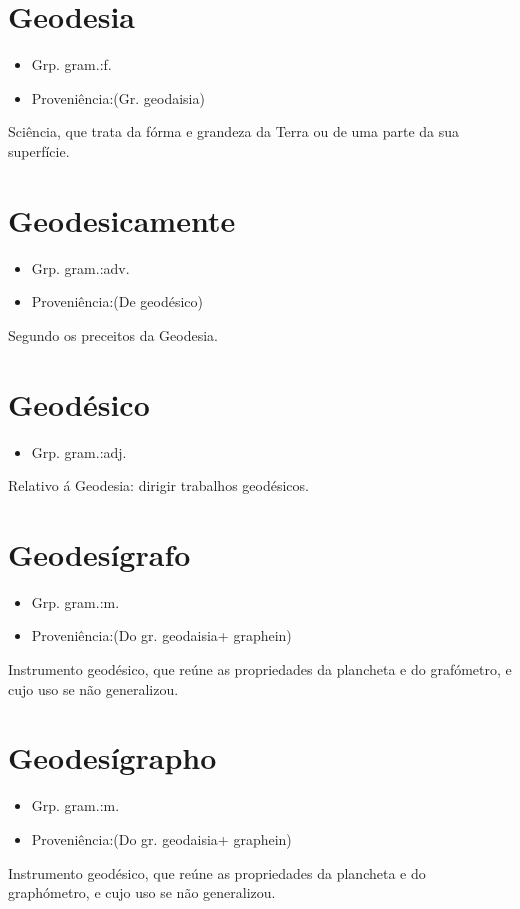 \section{Geodesia}
\begin{itemize}
\item {Grp. gram.:f.}
\end{itemize}
\begin{itemize}
\item {Proveniência:(Gr. \textunderscore geodaisia\textunderscore )}
\end{itemize}
Sciência, que trata da fórma e grandeza da Terra ou de uma parte da sua superfície.
\section{Geodesicamente}
\begin{itemize}
\item {Grp. gram.:adv.}
\end{itemize}
\begin{itemize}
\item {Proveniência:(De \textunderscore geodésico\textunderscore )}
\end{itemize}
Segundo os preceitos da Geodesia.
\section{Geodésico}
\begin{itemize}
\item {Grp. gram.:adj.}
\end{itemize}
Relativo á Geodesia: \textunderscore dirigir trabalhos geodésicos\textunderscore .
\section{Geodesígrafo}
\begin{itemize}
\item {Grp. gram.:m.}
\end{itemize}
\begin{itemize}
\item {Proveniência:(Do gr. \textunderscore geodaisia\textunderscore  + \textunderscore graphein\textunderscore )}
\end{itemize}
Instrumento geodésico, que reúne as propriedades da plancheta e do grafómetro, e cujo uso se não generalizou.
\section{Geodesígrapho}
\begin{itemize}
\item {Grp. gram.:m.}
\end{itemize}
\begin{itemize}
\item {Proveniência:(Do gr. \textunderscore geodaisia\textunderscore  + \textunderscore graphein\textunderscore )}
\end{itemize}
Instrumento geodésico, que reúne as propriedades da plancheta e do graphómetro, e cujo uso se não generalizou.
